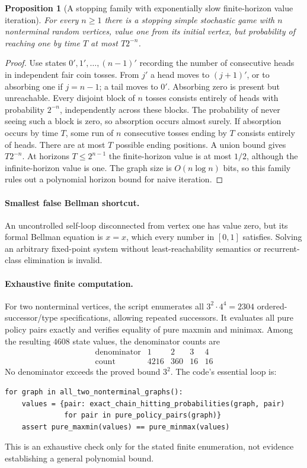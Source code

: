 \documentclass[11pt,a4paper]{article}
\newtheorem{proposition}[theorem]{Proposition}
\theoremstyle{definition}
\theoremstyle{remark}
\begin{document}
\begin{proposition}[A stopping family with exponentially slow finite-horizon value iteration]
For every $n\geq1$ there is a stopping simple stochastic game with $n$ nonterminal random vertices, value one from its initial vertex, but probability of reaching one by time $T$ at most $T2^{-n}$.
\end{proposition}
\begin{proof}
Use states $0',1',\ldots,(n-1)'$ recording the number of consecutive heads in independent fair coin tosses. From $j'$ a head moves to $(j+1)'$, or to absorbing one if $j=n-1$; a tail moves to $0'$. Absorbing zero is present but unreachable. Every disjoint block of $n$ tosses consists entirely of heads with probability $2^{-n}$, independently across these blocks. The probability of never seeing such a block is zero, so absorption occurs almost surely. If absorption occurs by time $T$, some run of $n$ consecutive tosses ending by $T$ consists entirely of heads. There are at most $T$ possible ending positions. A union bound gives $T2^{-n}$. At horizons $T\leq2^{n-1}$ the finite-horizon value is at most $1/2$, although the infinite-horizon value is one. The graph size is $O(n\log n)$ bits, so this family rules out a polynomial horizon bound for naive iteration.
\end{proof}

\paragraph{Smallest false Bellman shortcut.}
An uncontrolled self-loop disconnected from vertex one has value zero, but its formal Bellman equation is $x=x$, which every number in $[0,1]$ satisfies. Solving an arbitrary fixed-point system without least-reachability semantics or recurrent-class elimination is invalid.

\paragraph{Exhaustive finite computation.}
For two nonterminal vertices, the script enumerates all $3^2\cdot4^4=2304$ ordered-successor/type specifications, allowing repeated successors. It evaluates all pure policy pairs exactly and verifies equality of pure maxmin and minimax. Among the resulting $4608$ state values, the denominator counts are
\[
 \begin{array}{c|rrrr}
 \text{denominator}&1&2&3&4\\\hline
 \text{count}&4216&360&16&16
 \end{array}
\]
No denominator exceeds the proved bound $3^2$. The code's essential loop is:
\begin{lstlisting}
for graph in all_two_nonterminal_graphs():
    values = {pair: exact_chain_hitting_probabilities(graph, pair)
              for pair in pure_policy_pairs(graph)}
    assert pure_maxmin(values) == pure_minmax(values)
\end{lstlisting}
This is an exhaustive check only for the stated finite enumeration, not evidence establishing a general polynomial bound.
\end{document}
